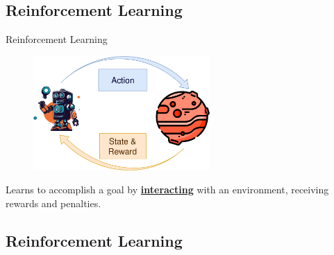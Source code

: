 \subsection{Reinforcement Learning}
\begin{frame}{Reinforcement Learning}
    \begin{figure}
      \centering
      \includegraphics[width=0.6\textwidth]{img/rl-cycle.png}
    \end{figure}
    Learns to accomplish a goal by \textbf{\underline{interacting}} with an environment, receiving rewards and penalties.
\end{frame}

\subsection{Reinforcement Learning}

